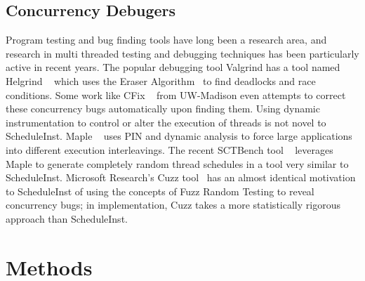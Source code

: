 \documentclass[10pt,]{article} %
\begin{document}
\subsection{Concurrency Debugers}

Program testing and bug finding tools have long been a research area, and research in multi threaded testing and debugging techniques has been particularly active in recent years. The popular debugging tool Valgrind has a tool named Helgrind ~\cite{Helgrind} which uses the Eraser Algorithm~\cite{Eraser} to find deadlocks and race conditions.   Some work like CFix ~\cite{Liblit} from UW-Madison even attempts to correct these concurrency bugs automatically upon finding them.  Using dynamic instrumentation to control or alter the execution of threads is not novel to ScheduleInst.  Maple ~\cite{Maple} uses PIN and dynamic analysis to force large applications into different execution interleavings.  The recent SCTBench tool ~\cite{Thomson} leverages Maple to generate completely random thread schedules in a tool very similar to ScheduleInst.  Microsoft Research’s Cuzz tool~\cite{Cuzz} has an almost identical motivation to ScheduleInst of using the concepts of Fuzz Random Testing to reveal concurrency bugs; in implementation, Cuzz takes a more statistically rigorous approach than ScheduleInst.  


\section{Methods}
\end{document}
